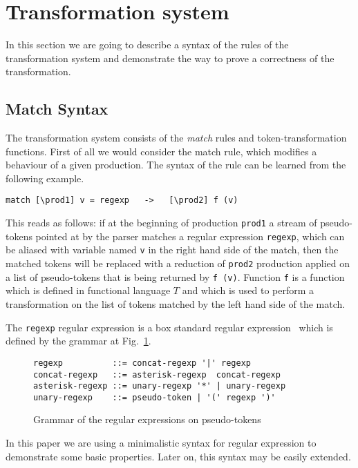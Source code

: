 \section{\label{sec:dynext}Transformation system}

In this section we are going to describe a syntax of the rules of 
the transformation system and demonstrate the way to prove a correctness
of the transformation.

\subsection{Match Syntax}

The transformation system consists of the \textit{match} rules and
token-transformation functions.  First of all we would consider the
match rule, which modifies a behaviour of a given production.  The
syntax of the rule can be learned from the following example.
\begin{verbatim}
match [\prod1] v = regexp   ->   [\prod2] f (v)
\end{verbatim}
This reads as follows: if at the beginning of production \verb|prod1|
a stream of pseudo-tokens pointed at by the parser matches a regular expression
\verb|regexp|, which can be aliased with variable named \verb|v| in the
right hand side of the match, then the matched tokens will be replaced 
with a reduction of \verb|prod2| production applied on a list of 
pseudo-tokens that is being returned by \verb|f (v)|.  Function \verb|f|
is a function which is defined in functional language $T$ and which
is used to perform a transformation on the list of tokens matched by
the left hand side of the match.  

The \verb|regexp| regular expression is a box standard regular
expression~\cite{regexp} which is defined by the grammar at 
Fig.~\ref{fig:reggram}.
\begin{figure}[h!]
\begin{verbatim}
regexp          ::= concat-regexp '|' regexp
concat-regexp   ::= asterisk-regexp  concat-regexp
asterisk-regexp ::= unary-regexp '*' | unary-regexp
unary-regexp    ::= pseudo-token | '(' regexp ')'
\end{verbatim}
\caption{\label{fig:reggram}Grammar of the regular expressions on
pseudo-tokens}
\end{figure}
In this paper we are using a minimalistic syntax for regular expression
to demonstrate some basic properties.  Later on, this syntax may be 
easily extended.


